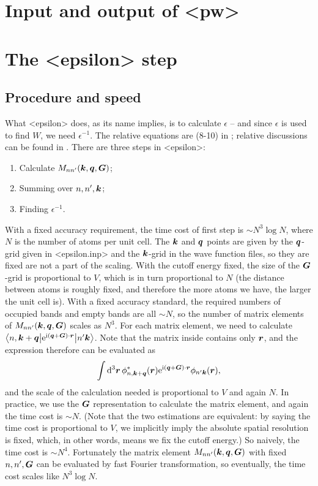 \documentclass[hyperref, a4paper]{report}
\newcommand*{\ii}{\mathrm{i}}
\newcommand*{\ee}{\mathrm{e}}
\def\texttt#1{<#1>}%
\newcommand{\shortcode}[1]{\texttt{#1}}
\begin{document}
\section{Input and output of \shortcode{pw}}

\section{The \shortcode{epsilon} step}

\subsection{Procedure and speed}\label{sec:epsilon.procedure-speed}

What \shortcode{epsilon} does, 
as its name implies, is to calculate $\epsilon$ --
and since $\epsilon$ is used to find $W$,
we need $\epsilon^{-1}$.
The relative equations are (8-10) in \cite{berkeleygw};
relative discussions can be found in .
There are three steps in \shortcode{epsilon}:
\begin{enumerate}
    \item Calculate $M_{nn'}(\vb*{k}, \vb*{q}, \vb*{G})$;
    \item Summing over $n, n', \vb*{k}$;
    \item Finding $\epsilon^{-1}$.
\end{enumerate}

With a fixed accuracy requirement,
the time cost of first step is $\sim N^3 \log N$,
where $N$ is the number of atoms per unit cell.
The $\vb*{k}$ and $\vb*{q}$ points are given 
by the $\vb*{q}$-grid given in \shortcode{epsilon.inp}
and the $\vb*{k}$-grid in the wave function files,
so they are fixed are not a part of the scaling.
With the cutoff energy fixed,
the size of the $\vb*{G}$-grid is proportional to $V$,
which is in turn proportional to $N$
(the distance between atoms is roughly fixed,
and therefore the more atoms we have,
the larger the unit cell is).
With a fixed accuracy standard,
the required numbers of occupied bands and empty bands 
are all $\sim N$,
so the number of matrix elements of $M_{nn'}(\vb*{k}, \vb*{q}, \vb*{G})$ scales as $N^3$.
For each matrix element, 
we need to calculate 
$\mel**{n, \vb*{k} + \vb*{q}}{\ee^{\ii (\vb*{q} + \vb*{G}) \cdot \vb*{r} }}{n' \vb*{k}}$.
Note that the matrix inside contains only $\vb*{r}$,
and the expression therefore can be evaluated as 
\[
    \int \dd[3]{\vb*{r}} \phi_{n, \vb*{k} + \vb*{q}}^*(\vb*{r}) 
    \ee^{\ii (\vb*{q} + \vb*{G}) \cdot \vb*{r}}
    \phi_{n' \vb*{k}}(\vb*{r}),
\]
and the scale of the calculation needed is proportional to $V$
and again $N$.
In practice, we use the $\vb*{G}$ representation to calculate the matrix element,
and again the time cost is $\sim N$.
(Note that the two estimations are equivalent: 
by saying the time cost is proportional to $V$,
we implicitly imply the absolute spatial resolution is fixed,
which, in other words, means we fix the cutoff energy.)
So naively, the time cost is $\sim N^4$.
Fortunately the matrix element $M_{nn'}(\vb*{k}, \vb*{q}, \vb*{G})$
with fixed $n, n', \vb*{G}$ 
can be evaluated by fast Fourier transformation,
so eventually, the time cost scales like $N^3 \log N$.
\end{document}
